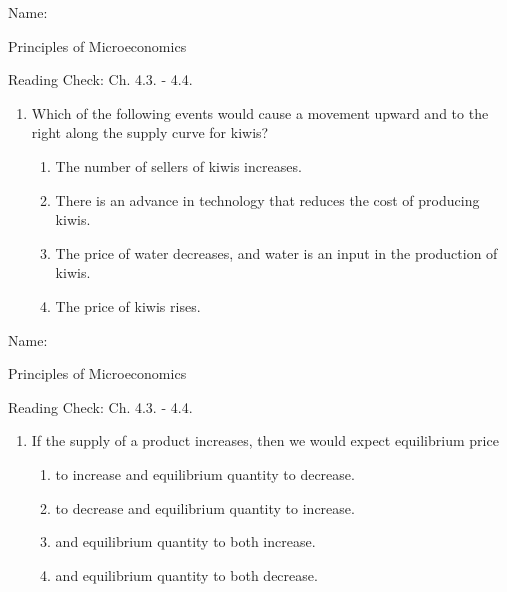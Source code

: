 \documentclass{article}
\begin{document}
\newpage

Name: \underline{\phantom{xxxxxxxxxxxxxxxxxxxx}}

Principles of Microeconomics

Reading Check: Ch. 4.3. - 4.4.

\begin{enumerate}

\item Which of the following events would cause a movement upward and to the right along the supply curve for kiwis?

	\begin{enumerate}
	
	\item The number of sellers of kiwis increases.

	\item There is an advance in technology that reduces the cost of producing kiwis.

	\item The price of water decreases, and water is an input in the production of kiwis.
	
	\item The price of kiwis rises.
	
	\end{enumerate}

\end{enumerate}

\bigskip

Name: \underline{\phantom{xxxxxxxxxxxxxxxxxxxx}}

Principles of Microeconomics

Reading Check: Ch. 4.3. - 4.4.

\begin{enumerate}

\item If the supply of a product increases, then we would expect equilibrium price

	\begin{enumerate}
	
	\item to increase and equilibrium quantity to decrease.
	
	\item to decrease and equilibrium quantity to increase.
	
	\item and equilibrium quantity to both increase.
	
	\item and equilibrium quantity to both decrease.
	
	\end{enumerate}

\end{enumerate}
\end{document}
